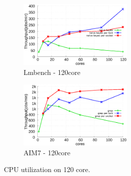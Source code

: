 \begin{figure}[tb]
\begin{subfigure}[b]{0.33\textwidth}
    \end{subfigure}%
        \begin{subfigure}[b]{0.33\textwidth}
        \includegraphics[width=2.2in]{graph/nb_docker.eps}
        \caption{Lmbench - 120core}
    \end{subfigure}%
    \begin{subfigure}[b]{0.33\textwidth}
        \includegraphics[width=2.2in]{graph/grep_docker.eps}
        \caption{AIM7 - 120core}
    \end{subfigure}
        \centering
    \caption{CPU utilization on 120 core.}
    \label{fig:utilization3}
\end{figure}



